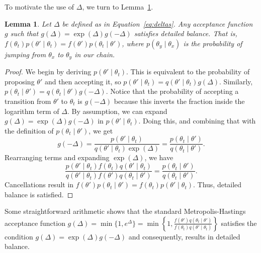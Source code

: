 \documentclass{article}
\newtheorem{lemma}{Lemma}
\begin{document}
To motivate the use of $\Delta$, we turn to Lemma~\ref{lem:detailed_balance}.

\begin{lemma}\label{lem:detailed_balance}
Let $\Delta$ be defined as in Equation~\ref{eq:deltas}. Any acceptance function $g$ such that
$g(\Delta) = \exp(\Delta) g(-\Delta )$ satisfies detailed balance. That is, $f(\theta_t)p(\theta'
\mid \theta_t) = f(\theta')p(\theta_t \mid \theta')$, where $p(\theta_y \mid \theta_x)$ is the
probability of jumping from $\theta_x$ to $\theta_y$ in our chain.
\end{lemma}

\begin{proof}
We begin by deriving $p(\theta' \mid \theta_t)$. This is equivalent to the probability of proposing
$\theta'$ and then accepting it, so $p(\theta' \mid \theta_t) = q(\theta' \mid \theta_t)g(\Delta).$
Similarly, $p(\theta_t \mid \theta') = q(\theta_t \mid \theta')g(-\Delta).$ Notice that the
probability of accepting a transition from $\theta'$ to $\theta_t$ is $g(-\Delta)$ because this
inverts the fraction inside the logarithm term of $\Delta$.  By assumption, we can expand $g(\Delta)
= \exp(\Delta)g(-\Delta)$ in $p(\theta' \mid \theta_t)$. Doing this, and combining that with the
definition of $p(\theta_t \mid \theta')$, we get
\begin{equation}\label{eq:combined}
g(-\Delta) = \frac{p(\theta' \mid \theta_t)}{q(\theta' \mid \theta_t)\exp(\Delta)} = \frac{p(\theta_t \mid \theta')}{q(\theta_t \mid \theta')}.
\end{equation}
Rearranging terms and expanding $\exp(\Delta)$, we have
\begin{equation}\label{eq:rearrange}
\frac{p(\theta' \mid \theta_t) f(\theta_t) q(\theta' \mid \theta_t)}{q(\theta' \mid \theta_t) f(\theta') q(\theta_t \mid \theta')} = \frac{p(\theta_t \mid \theta')}{ q(\theta_t \mid \theta')}.
\end{equation}
Cancellations result in $f(\theta') p(\theta_t \mid \theta') = f(\theta_t) p(\theta' \mid
\theta_t)$. Thus, detailed balance is satisfied.
\end{proof}

Some straightforward arithmetic shows that the standard Metropolis-Hastings acceptance function
$g(\Delta) = \min\{1, e^\Delta \} = \min\left\{1, \frac{f(\theta')q(\theta_t \mid
\theta')}{f(\theta_t)q(\theta' \mid \theta_t)}\right\}$ satisfies the condition $g(\Delta) =
\exp(\Delta)g(-\Delta)$ and consequently, results in detailed balance.
\end{document}
